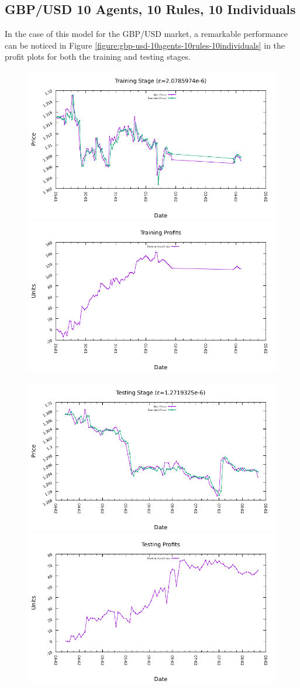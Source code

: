 \newpage

\subsection{GBP/USD 10 Agents, 10 Rules, 10 Individuals}
\label{results:forecast-gbp-usd-10agents-10rules-10individuals}

In the case of this model for the GBP/USD market, a remarkable performance can be noticed in Figure \ref{figure:gbp-usd-10agents-10rules-10individuals} in the profit plots for both the training and testing stages.

\begin{figure}[htp]
  \centering

  \includegraphics[width=.45\textwidth]{img/plots/gbp_usd_h1-10agents-10rules-10ind-100gen_training_fit.pdf}\quad
  \includegraphics[width=.45\textwidth]{img/plots/gbp_usd_h1-10agents-10rules-10ind-100gen_training_profits.pdf}

  \medskip

  \includegraphics[width=.45\textwidth]{img/plots/gbp_usd_h1-10agents-10rules-10ind-100gen_testing_fit.pdf}\quad
  \includegraphics[width=.45\textwidth]{img/plots/gbp_usd_h1-10agents-10rules-10ind-100gen_testing_profits.pdf}


\end{figure}
